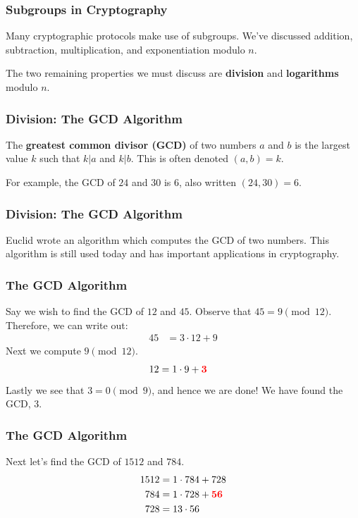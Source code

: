 \documentclass{beamer}
\newcommand{\<}{\langle}
\renewcommand{\>}{\rangle}
\begin{document}
\begin{frame}
\frametitle{Subgroups in Cryptography}

Many cryptographic protocols make use of subgroups. We've discussed addition, subtraction, multiplication, and exponentiation modulo $n$.\newline

The two remaining properties we must discuss are \textbf{division} and \textbf{logarithms} modulo $n$.
\end{frame}


\begin{frame}
\frametitle{Division: The GCD Algorithm}

The \textbf{greatest common divisor (GCD)} of two numbers $a$ and $b$ is the largest value $k$ such that $k|a$ and $k|b$. This is often denoted $(a,b) = k$.\newline

For example, the GCD of $24$ and $30$ is $6$, also written $(24, 30) = 6$.
\end{frame}




\begin{frame}
\frametitle{Division: The GCD Algorithm}

Euclid wrote an algorithm which computes the GCD of two numbers. This algorithm is still used today and has important applications in cryptography.
\end{frame}


\begin{frame}
\frametitle{The GCD Algorithm}

Say we wish to find the GCD of $12$ and $45$. Observe that $45 = 9 \pmod{12}$. Therefore, we can write out:
\begin{align*}
45 &= 3 \cdot 12 + 9
\end{align*}
Next we compute $9 \pmod{12}$.
\begin{align*}
12 &= 1 \cdot 9 + {\color{red}\mathbf{3}} 
\end{align*}
Lastly we see that $3 = 0 \pmod 9$, and hence we are done! We have found the GCD, 3.
\end{frame}

\begin{frame}
\frametitle{The GCD Algorithm}

Next let's find the GCD of $1512$ and $784$.
\begin{align*}
1512 &= 1 \cdot 784 + 728 \\
784 &= 1 \cdot 728 + {\color{red}\mathbf{56}} \\
728 &= 13\cdot 56
\end{align*}
\end{frame}
\end{document}
